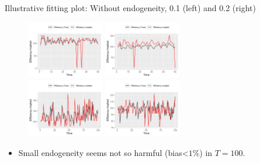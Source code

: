 \documentclass[aspectratio=169]{beamer}
\begin{document}
\begin{frame}{Illustrative fitting plot: Without endogeneity, 0.1 (left) and 0.2 (right)}
\begin{figure}[!ht]
  \begin{center}
  \includegraphics[width = 0.30\textwidth]
  {figuretable/illustrative_plot_implied_efficiency_num_time_50_cobb_douglas_0.3_AR1_I0_va_dependency_0.1.png}
  \includegraphics[width = 0.30\textwidth]
  {figuretable/illustrative_plot_implied_efficiency_num_time_50_cobb_douglas_0.3_AR1_I0_va_dependency_0.2.png}\\

  \includegraphics[width = 0.30\textwidth]
  {figuretable/illustrative_plot_implied_efficiency_num_time_100_cobb_douglas_0.3_AR1_I0_va_dependency_0.1.png}
  \includegraphics[width = 0.30\textwidth]
  {figuretable/illustrative_plot_implied_efficiency_num_time_100_cobb_douglas_0.3_AR1_I0_va_dependency_0.2.png}
  \end{center}
  \footnotesize
\end{figure} 
\begin{itemize}
    \item Small endogeneity seems not so harmful (bias<$1\%$) in $T=100$.
\end{itemize}
\end{frame}
\end{document}
